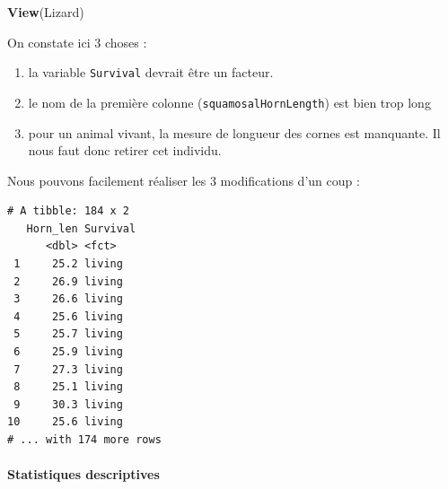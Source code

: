 \documentclass[a4paperpaper,]{article}
\newenvironment{Shaded}{\begin{snugshade}}{\end{snugshade}}
\newcommand{\DataTypeTok}[1]{\textcolor[rgb]{0.00,0.34,0.68}{#1}}
\newcommand{\KeywordTok}[1]{\textcolor[rgb]{0.12,0.11,0.11}{\textbf{#1}}}
\newcommand{\NormalTok}[1]{\textcolor[rgb]{0.12,0.11,0.11}{#1}}
\newcommand{\OperatorTok}[1]{\textcolor[rgb]{0.12,0.11,0.11}{#1}}
\newcommand{\StringTok}[1]{\textcolor[rgb]{0.75,0.01,0.01}{#1}}
\providecommand{\tightlist}{%
  \setlength{\itemsep}{0pt}\setlength{\parskip}{0pt}}
\let\oldparagraph\paragraph
\renewcommand{\paragraph}[1]{\oldparagraph{#1}\mbox{}}
\begin{document}
\begin{Shaded}
\begin{Highlighting}[]
\KeywordTok{View}\NormalTok{(Lizard)}
\end{Highlighting}
\end{Shaded}

On constate ici 3 choses :

\begin{enumerate}
\def\labelenumi{\arabic{enumi}.}
\tightlist
\item
  la variable \texttt{Survival} devrait être un facteur.
\item
  le nom de la première colonne (\texttt{squamosalHornLength}) est bien trop long
\item
  pour un animal vivant, la mesure de longueur des cornes est manquante. Il nous faut donc retirer cet individu.
\end{enumerate}

Nous pouvons facilement réaliser les 3 modifications d'un coup :

\begin{Shaded}
\end{Shaded}

\begin{verbatim}
# A tibble: 184 x 2
   Horn_len Survival
      <dbl> <fct>   
 1     25.2 living  
 2     26.9 living  
 3     26.6 living  
 4     25.6 living  
 5     25.7 living  
 6     25.9 living  
 7     27.3 living  
 8     25.1 living  
 9     30.3 living  
10     25.6 living  
# ... with 174 more rows
\end{verbatim}

\hypertarget{statistiques-descriptives-2}{%
\paragraph{Statistiques descriptives}\label{statistiques-descriptives-2}}
\end{document}
